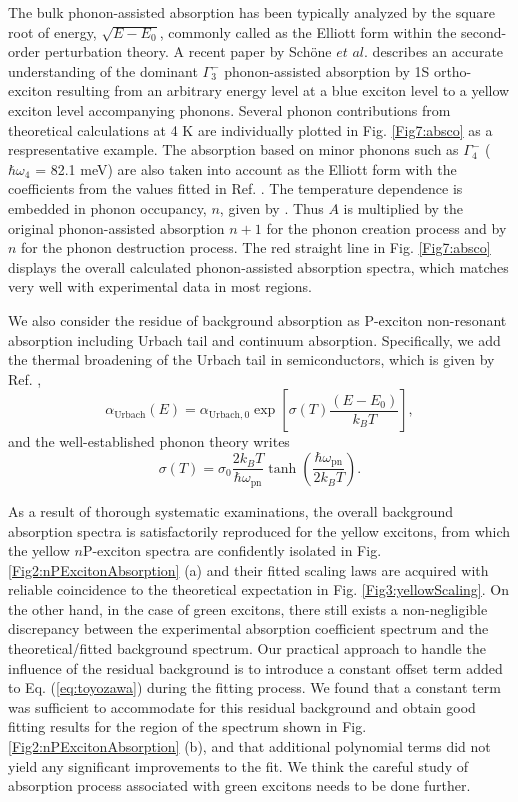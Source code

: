 \documentclass[aps,reprint,amsmath,amssymb,prb]{revtex4-1}
\begin{document}
The bulk phonon-assisted absorption has been typically analyzed by the square root of energy, $\sqrt{E-E_{0}}$, commonly called as the Elliott form \cite{Elliott1957} within the second-order perturbation theory. A recent paper by Sch\"{o}ne $et$  $al.$  \cite{Schone2017} describes an accurate understanding of the dominant ${\Gamma}_3^{-}$ phonon-assisted absorption by 1S ortho-exciton resulting from an arbitrary energy level at a blue exciton level to a yellow exciton level accompanying phonons. Several phonon contributions from theoretical calculations at 4 K are individually plotted in Fig. \ref{Fig7:absco} as a respresentative example. The absorption based on minor phonons such as ${\Gamma}_4^{-}$ ($\hbar\omega_4$ = 82.1 meV) are also taken into account as the Elliott form with the coefficients from the values fitted in Ref. \cite{Schone2017}. The temperature dependence is embedded in phonon occupancy, $n$, given by \cite{Elliott1957}.
Thus $A$ is multiplied by the original phonon-assisted absorption $n+1$
for the phonon creation process and by $n$ for the phonon destruction process.
The red straight line in Fig. \ref{Fig7:absco} displays the overall calculated phonon-assisted absorption spectra, which matches very well with experimental data in most regions.

We also consider the residue of background absorption as P-exciton non-resonant absorption including Urbach tail and continuum absorption.
Specifically, we add the thermal broadening of the Urbach tail in semiconductors, which is given by Ref. \cite{Urbach1953},  
\begin{equation}
\alpha_{\text{Urbach}}(E) = \alpha_{{\text{Urbach}},0} \exp \left[\sigma(T) \frac{\left(E-E_{0}\right)}{k_{B} T}\right],
\end{equation}
and the well-established phonon theory \cite{Dow1972,Rai2013} writes
\begin{equation}
\sigma(T)=\sigma_{0} \frac{2 k_{B} T}{\hbar \omega_{\text{pn}}} \tanh \left(\frac{\hbar \omega_{\text{pn}}}{2 k_{B} T}\right).
\end{equation}

As a result of thorough systematic examinations, the overall background absorption spectra is satisfactorily reproduced for the yellow excitons, from which the yellow $n$P-exciton spectra are confidently isolated in Fig. \ref{Fig2:nPExcitonAbsorption} (a) and their fitted scaling laws are acquired with reliable coincidence to the theoretical expectation in Fig. \ref{Fig3:yellowScaling}. On the other hand, in the case of green excitons, there still exists a non-negligible discrepancy between the experimental absorption coefficient spectrum and the theoretical/fitted background spectrum. Our practical approach to handle the influence of the residual background is to introduce a constant offset term added to Eq. (\ref{eq:toyozawa}) during the fitting process. We found that a constant term was sufficient to accommodate for this residual background and obtain good fitting results for the region of the spectrum shown in Fig. \ref{Fig2:nPExcitonAbsorption} (b), and that additional polynomial terms did not yield any significant improvements to the fit. We think the careful study of absorption process associated with green excitons needs to be done further.
\end{document}
